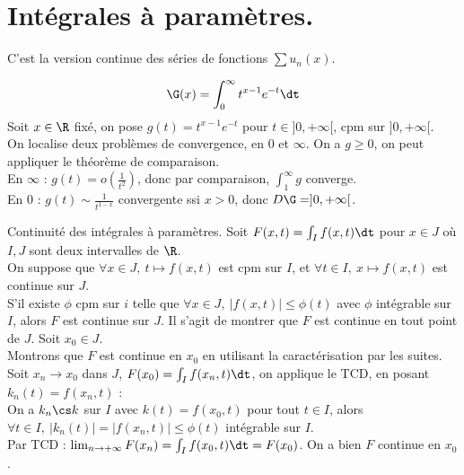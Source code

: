 \documentclass[11pt]{article}
\begin{document}
\vspace*{-0.7cm}

\section{Intégrales à paramètres.}

\vspace*{-0.3cm}

C'est la version continue des séries de fonctions $\sum u_n(x)$.

\begin{ex}{}{}
    \begin{equation*}
        \G(x)=\int_0^{\infty}t^{x-1}e^{-t}\dt
    \end{equation*}
    \tcblower
    Soit $x\in\R$ fixé, on pose $g(t)=t^{x-1}e^{-t}$ pour $t\in]0,+\infty[$, cpm sur $]0,+\infty[$.\\
    On localise deux problèmes de convergence, en 0 et $\infty$. On a $g\geq0$, on peut appliquer le théorème de comparaison.\\
    En $\infty$ : $g(t)=o(\frac{1}{t^2})$, donc par comparaison, $\int_{1}^{\infty} g$ converge.\\
    En 0 : $g(t)\sim \frac{1}{t^{1-x}}$ convergente ssi $x>0$, donc $D\G=]0,+\infty[$.
\end{ex}

\vspace*{-0.7cm}

\begin{thm}{Continuité des intégrales à paramètres.}{}
    Soit $F(x,t)=\int_I f(x,t)\dt$ pour $x\in J$ où $I,J$ sont deux intervalles de $\R$.\\
    On suppose que $\forall x\in J, ~ t\mapsto f(x,t)$ est cpm sur $I$, et $\forall t \in I, ~ x\mapsto f(x,t)$ est continue sur $J$.\\
    S'il existe $\phi$ cpm sur $i$ telle que $\forall x \in J, ~ |f(x,t)|\leq\phi(t)$ avec $\phi$ intégrable sur $I$, alors $F$ est continue sur $J$.
    \tcblower
    Il s'agit de montrer que $F$ est continue en tout point de $J$. Soit $x_0\in J$.\\
    Montrons que $F$ est continue en $x_0$ en utilisant la caractérisation par les suites.\\
    Soit $x_n\to x_0$ dans $J$, $F(x_0) = \int_If(x_n,t)\dt$, on applique le TCD, en posant $k_n(t)=f(x_n,t)$ :\\
    On a $k_n \cs k$ sur $I$ avec $k(t)=f(x_0,t)$ pour tout $t\in I$, alors $\forall t \in I, ~ |k_n(t)|=|f(x_n,t)|\leq\phi(t)$ intégrable sur $I$.\\
    Par TCD : $\lim_{n\to+\infty} F(x_n) = \int_I f(x_0,t)\dt=F(x_0)$. On a bien $F$ continue en $x_0$.
\end{thm}
\end{document}
